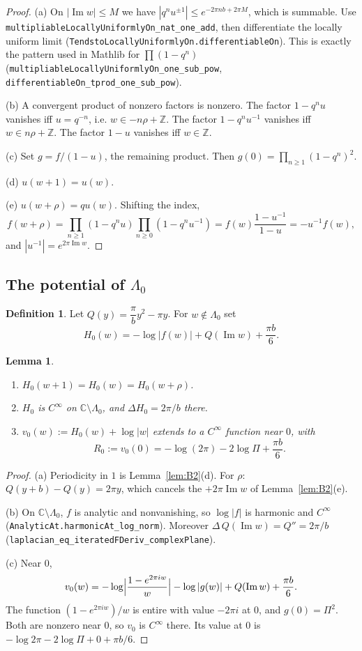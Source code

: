 \documentclass[11pt]{article}
\newtheorem{lemma}[theorem]{Lemma}
\theoremstyle{definition}
\newtheorem{definition}[theorem]{Definition}
\theoremstyle{remark}
\newcommand{\C}{\mathbb C}
\newcommand{\Z}{\mathbb Z}
\newcommand{\LamO}{\Lambda_0}
\newcommand{\lean}[1]{\texttt{#1}}
\DeclareMathOperator{\Imag}{Im}
\begin{document}
\begin{proof}
(a) On $|\Imag w|\le M$ we have $|q^nu^{\pm1}|\le e^{-2\pi nb+2\pi M}$, which is summable. Use \lean{multipliableLocallyUniformlyOn\_nat\_one\_add}, then differentiate the locally uniform limit
(\lean{TendstoLocallyUniformlyOn.differentiableOn}). This is exactly the pattern used in Mathlib for
$\prod(1-q^n)$ (\lean{multipliableLocallyUniformlyOn\_one\_sub\_pow}, \lean{differentiableOn\_tprod\_one\_sub\_pow}).

(b) A convergent product of nonzero factors is nonzero. The factor $1-q^nu$ vanishes iff $u=q^{-n}$, i.e.
$w\in-n\rho+\Z$. The factor $1-q^nu^{-1}$ vanishes iff $w\in n\rho+\Z$. The factor $1-u$ vanishes iff $w\in\Z$.

(c) Set $g=f/(1-u)$, the remaining product. Then $g(0)=\prod_{n\ge1}(1-q^n)^2$.

(d) $u(w+1)=u(w)$.

(e) $u(w+\rho)=qu(w)$. Shifting the index,
\[
 f(w+\rho)=\prod_{n\ge1}(1-q^nu)\prod_{n\ge0}(1-q^nu^{-1})=f(w)\frac{1-u^{-1}}{1-u}=-u^{-1}f(w),
\]
and $|u^{-1}|=e^{2\pi\Imag w}$.
\end{proof}

\subsection{The potential of $\LamO$}

\begin{definition}\label{def:H0}
Let $Q(y)=\dfrac{\pi}{b}y^2-\pi y$. For $w\notin\LamO$ set
\[
 H_0(w)=-\log|f(w)|+Q(\Imag w)+\frac{\pi b}6 .
\]
\end{definition}

\begin{lemma}\label{lem:B3}
\begin{enumerate}
\item[(a)] $H_0(w+1)=H_0(w)=H_0(w+\rho)$.
\item[(b)] $H_0$ is $C^\infty$ on $\C\setminus\LamO$, and $\Delta H_0=2\pi/b$ there.
\item[(c)] $v_0(w):=H_0(w)+\log|w|$ extends to a $C^\infty$ function near $0$, with
\[
 R_0:=v_0(0)=-\log(2\pi)-2\log\Pi+\frac{\pi b}6.
\]
\end{enumerate}
\end{lemma}

\begin{proof}
(a) Periodicity in $1$ is Lemma~\ref{lem:B2}(d). For $\rho$: $Q(y+b)-Q(y)=2\pi y$, which cancels the
$+2\pi\Imag w$ of Lemma~\ref{lem:B2}(e).

(b) On $\C\setminus\LamO$, $f$ is analytic and nonvanishing, so $\log|f|$ is harmonic and $C^\infty$
(\lean{AnalyticAt.harmonicAt\_log\_norm}). Moreover
$\Delta\,Q(\Imag w)=Q''=2\pi/b$ (\lean{laplacian\_eq\_iteratedFDeriv\_complexPlane}).

(c) Near $0$,
\[
 v_0(w)=-\log\Bigl|\frac{1-e^{2\pi iw}}{w}\Bigr|-\log|g(w)|+Q(\Imag w)+\frac{\pi b}6 .
\]
The function $(1-e^{2\pi iw})/w$ is entire with value $-2\pi i$ at $0$, and $g(0)=\Pi^2$. Both are nonzero near $0$,
so $v_0$ is $C^\infty$ there. Its value at $0$ is $-\log2\pi-2\log\Pi+0+\pi b/6$.
\end{proof}
\end{document}
